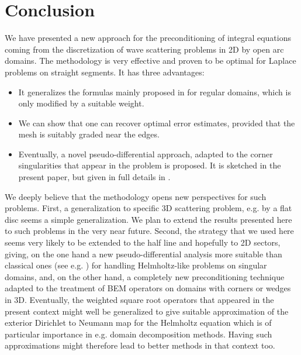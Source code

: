 \documentclass[a4paper]{article}
\begin{document}
\section{Conclusion} 
We have presented a new approach for the preconditioning of integral equations coming from the discretization of wave scattering problems
in 2D by open arc domains. The methodology is very effective and proven to be optimal for Laplace problems on straight segments. It has
three advantages:
\begin{itemize}
\item It generalizes the formulas mainly proposed in \cite{antoine2007generalized} for regular domains, which is only modified by a suitable weight.
\item We can show that one can recover optimal error estimates, provided that the mesh is suitably graded near the edges.
\item Eventually, a novel pseudo-differential approach, adapted to the corner singularities that appear in the problem is proposed.
It is sketched in the present paper, but given in full details in \cite{averseng}.
\end{itemize}
We deeply believe that the methodology opens new perspectives for such problems. First, a generalization to specific 3D scattering
problem, e.g. by a flat disc seems a simple generalization. We plan to extend the results presented here to such problems in the very
near future. Second, the strategy that we used here seems very likely to be extended to the half line and hopefully to 2D sectors, giving,
on the one hand a new pseudo-differential analysis more suitable than classical ones (see e.g. \cite{melrose,olapaivarinta,schulze1,schulze2})
for handling Helmholtz-like problems on singular domains, and, on the other hand, a completely new preconditioning  technique adapted
to the treatment of BEM operators on domains with corners or wedges in 3D. Eventually, the weighted square root operators that appeared
in the present context might well be generalized to give suitable approximation of the exterior Dirichlet to Neumann map for the Helmholtz equation
which is of particular importance in e.g. domain decomposition methods. Having such approximations might therefore lead to better
methods in that context too.
	
\end{document}
